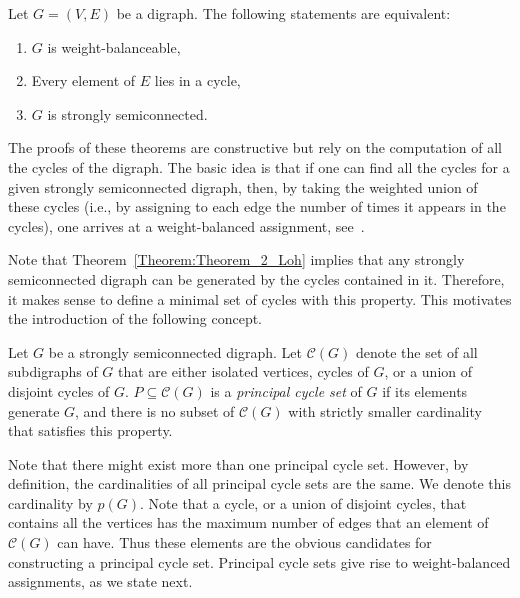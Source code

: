 \documentclass[final]{siamltex}
\begin{document}
\begin{theorem}\label{Theorem:Theorem_2_Loh}
  Let $ G =(V,E)$ be a digraph. The following statements are
  equivalent:
  \begin{enumerate}
  \item $ G $ is weight-balanceable,
  \item Every element of $ E $ lies in a cycle,
  \item $ G $ is strongly semiconnected.
  \end{enumerate}
\end{theorem}

The proofs of these theorems are constructive but rely on the
computation of all the cycles of the digraph. The basic idea is that
if one can find all the cycles for a given strongly semiconnected
digraph, then, by taking the weighted union of these cycles (i.e., by
assigning to each edge the number of times it appears in the cycles),
one arrives at a weight-balanced assignment, see~\cite{LHT:70}.

Note that Theorem~\ref{Theorem:Theorem_2_Loh} implies that any
strongly semiconnected digraph can be generated by the cycles
contained in it. Therefore, it makes sense to define a minimal set of
cycles with this property. This motivates the introduction of the
following concept.

\begin{definition}\label{def:independent_cycles}
  Let $ G $ be a strongly semiconnected digraph.  Let $ \mathcal{C}(G)
  $ denote the set of all subdigraphs of $ G $ that are either
  isolated vertices, cycles of $ G $, or a union of disjoint cycles of
  $ G $.  $P \subseteq \mathcal{C}(G) $ is a \emph{principal cycle
    set} of $ G $ if its elements generate $G$, and there is no subset
  of $ \mathcal{C}(G) $ with strictly smaller cardinality that
  satisfies this property.
\end{definition}

Note that there might exist more than one principal cycle
set. However, by definition, the cardinalities of all principal cycle
sets are the same. We denote this cardinality by $p(G)$.  Note that a
cycle, or a union of disjoint cycles, that contains all the vertices
has the maximum number of edges that an element of $\mathcal{C}(G) $
can have.  Thus these elements are the obvious candidates for
constructing a principal cycle set. Principal cycle sets give rise to
weight-balanced assignments, as we state next.
\end{document}
